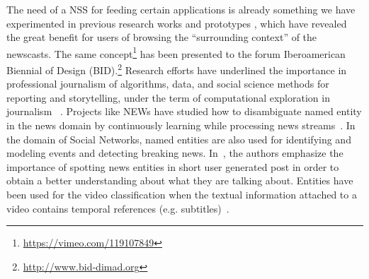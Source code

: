 \documentclass{llncs}
\begin{document}
The need of a NSS for feeding certain applications is already something we have experimented in previous research works and prototypes \cite{Redondo2014}, which have revealed the great benefit for users of browsing the ``surrounding context'' of the newscasts. The same concept\footnote{\url{https://vimeo.com/119107849}} has been presented to the forum Iberoamerican Biennial of Design (BID).\footnote{\url{http://www.bid-dimad.org}}
Research efforts have underlined the importance in professional journalism of algorithms, data, and social science methods for reporting and storytelling, under the term of computational exploration in journalism ~\cite{gynnild2014}.  %
Projects like NEWs have studied how to disambiguate named entity in the news domain by continuously learning while processing news streams~\cite{Fernandez2012}. In the domain of Social Networks, named entities are also used for identifying and modeling events and detecting breaking news. In~\cite{Steiner2013}, the authors emphasize the importance of spotting news entities in short user generated post in order to obtain a better understanding about what they are talking about. Entities have been used for the video classification when the textual information attached to a video contains temporal references (e.g. subtitles)~\cite{yunjia2013}. 
\end{document}

